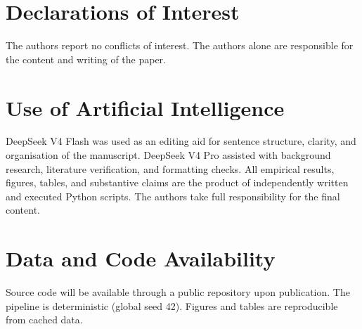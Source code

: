 \documentclass[12pt,a4paper]{article}
\begin{document}
\section*{Declarations of Interest}
The authors report no conflicts of interest. The authors alone are responsible for the content and writing of the paper.

\section*{Use of Artificial Intelligence}
DeepSeek V4 Flash was used as an editing aid for sentence structure, clarity, and organisation of the manuscript. DeepSeek V4 Pro assisted with background research, literature verification, and formatting checks. All empirical results, figures, tables, and substantive claims are the product of independently written and executed Python scripts. The authors take full responsibility for the final content.

\section*{Data and Code Availability}
Source code will be available through a public repository upon publication. The pipeline is deterministic (global seed 42). Figures and tables are reproducible from cached data.



\end{document}
